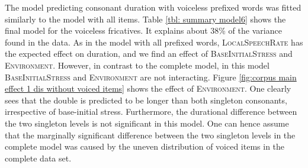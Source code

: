 
\begin{table}[b!]
	\caption{ Summary of linear model for variables predicting the Box-Cox-transformed duration of [s] in prefixed words with voiceless /s/}
	\label{tbl: summary model6}
	\begin{center}
	\end{center}
\end{table}

The model predicting consonant duration with voiceless prefixed words was fitted similarly to the model with all items. 
Table \ref{tbl: summary model6} shows the final model for the voiceless fricatives. It explains about 38\% of the variance found in the data. 
As in the model with all prefixed words, \textsc{LocalSpeechRate} has the expected effect on duration, and we find an effect of \textsc{BaseInitialStress} and \textsc{Environment}. However, in contrast to the complete model, in this model \textsc{BaseInitialStress} and \textsc{Environment} are not interacting. 
Figure \ref{fig:corpus main effect 1 dis without voiced items} shows the effect of  \textsc{Environment}. One clearly sees that the double is predicted to be longer than both singleton consonants, irrespective of base-initial stress. Furthermore, the durational difference between the two singleton levels is not significant in this model. One can hence assume that the marginally significant difference between the two singleton levels in the complete model was caused by the uneven distribution of voiced items in the complete data set. 


